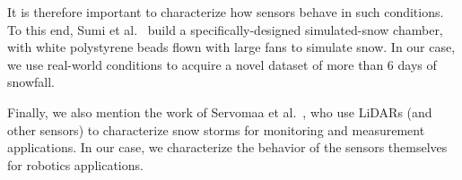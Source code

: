 It is therefore important to characterize how sensors behave in such conditions. To this end, Sumi et al.~\cite{sumi-arso-13} build a specifically-designed simulated-snow chamber, with white polystyrene beads flown with large fans to simulate snow. In our case, we use real-world conditions to acquire a novel dataset of more than 6 days of snowfall.

Finally, we also mention the work of Servomaa et al.~\cite{servomaa2002snowfall}, who use LiDARs (and other sensors) to characterize snow storms for monitoring and measurement applications. In our case, we characterize the behavior of the sensors themselves for robotics applications.







